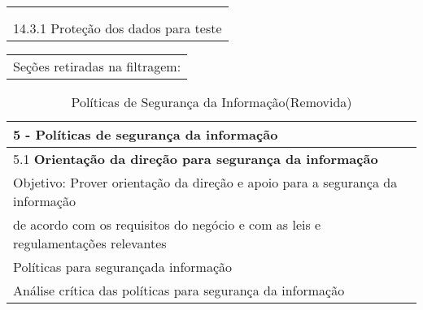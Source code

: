 \begin{table}[]
\begin{center}
\begin{tabular}{|l|l|l|l|l|l|}
\multicolumn{6}{|l|}{}                                                                                                                                                                                                                                                                                                                                                           \\
\multicolumn{6}{|l|}{}                                                                                                                                                                                                                                                                                                                                                           \\ \hline
\multicolumn{6}{|l|}{14.3.1 Proteção dos dados para teste}                                                                                                                                                                                                                                                                                                                       \\ \hline
\end{tabular}
\end{center}
\end{table}
 
 
 
\begin{table}[]
\begin{tabular}{l}
Seções retiradas na filtragem:
\end{tabular}
\end{table}


\begin{table}[]
\begin{center}
\caption{\label{tab:tab5}Políticas de Segurança da Informação(Removida)}%
\begin{tabular}{|l|}
\hline
5 - \textbf{Políticas de segurança da informação }                          \\ \hline
5.1\textbf{ Orientação da direção para segurança da informação} \\
Objetivo: Prover orientação da direção e apoio para a  segurança da informação \\ de acordo
com os requisitos do negócio e com as leis e regulamentações relevantes            \\ \hline
 Políticas para segurançada informação                      \\ \hline
 Análise crítica das políticas para segurança da informação \\ \hline
\end{tabular}
\end{center}
\end{table}

